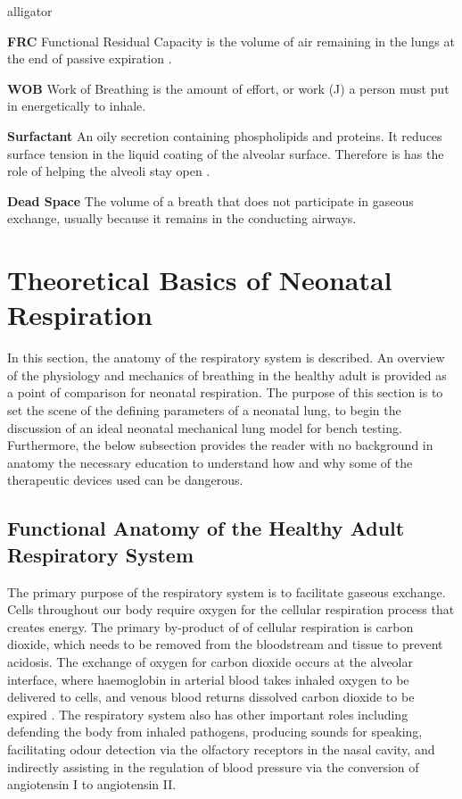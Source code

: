 \documentclass[12pt, openany, oneside]{book}
\begin{document}
\begin{labeling}{alligator}
\item [\textbf{FRC}] Functional Residual Capacity is the volume of air remaining in the lungs at the end of passive expiration \citep{sivieri}.

\item[\textbf{WOB}] Work of Breathing is the amount of effort, or work (J) a person must put in energetically to inhale.

\item[\textbf{Surfactant}] An oily secretion containing phospholipids and proteins. It reduces surface tension in the liquid coating of the alveolar surface. Therefore is has the role of helping the alveoli stay open \citep{martini}.

\item[\textbf{Dead Space}] The volume of a breath that does not participate in gaseous exchange, usually because it remains in the conducting airways. 

\end{labeling}


\section{Theoretical Basics of Neonatal Respiration}
In this section, the anatomy of the respiratory system is described. An overview of the physiology and mechanics of breathing in the healthy adult is provided as a point of comparison for neonatal respiration. The purpose of this section is to set the scene of the defining parameters of a neonatal lung, to begin the discussion of an ideal neonatal mechanical lung model for bench testing. Furthermore, the below subsection provides the reader with no background in anatomy the necessary education to understand how and why some of the therapeutic devices used can be dangerous.


\subsection{Functional Anatomy of the Healthy Adult Respiratory System}

The primary purpose of the respiratory system is to facilitate gaseous exchange. Cells throughout our body require oxygen for the cellular respiration process that creates energy. The primary by-product of of cellular respiration is carbon dioxide, which needs to be removed from the bloodstream and tissue to prevent acidosis. The exchange of oxygen for carbon dioxide occurs at the alveolar interface, where haemoglobin in arterial blood takes inhaled oxygen to be delivered to cells, and venous blood returns dissolved carbon dioxide to be expired \cite{dunn2016physiology}. The respiratory system also has other important roles including defending the body from inhaled pathogens, producing sounds for speaking, facilitating odour detection via the olfactory receptors in the nasal cavity, and indirectly assisting in the regulation of blood pressure via the conversion of angiotensin I to angiotensin II. \\
\end{document}
